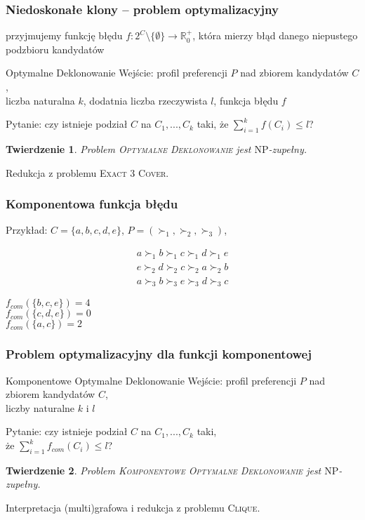 \documentclass{beamer}
\newtheorem{tw}{Twierdzenie}
\begin{document}
\begin{frame} \frametitle{Niedoskonałe klony -- problem optymalizacyjny}
  przyjmujemy funkcję błędu $f: 2^C \setminus \{\emptyset\} \rightarrow \mathbb{R}_0^+$,
  która mierzy błąd danego niepustego podzbioru kandydatów 
  
  
	\begin{aproblem}{Optymalne Deklonowanie}
		Wejście: profil preferencji $P$ nad zbiorem kandydatów $C$,\\
			liczba naturalna $k$, dodatnia liczba rzeczywista $l$, funkcja błędu $f$

		Pytanie: czy istnieje podział $C$ na $C_1, ..., C_k$ taki, że $\sum_{i=1}^k f(C_i) \leq l$?
	\end{aproblem}

	\vfill
	
	\begin{tw}
		Problem \textsc{Optymalne Deklonowanie} jest $\text{NP}$-zupełny.
	\end{tw}
	
	Redukcja z problemu \textsc{Exact 3 Cover}.
\end{frame}

\begin{frame} \frametitle{Komponentowa funkcja błędu}
	Przykład: $C = \{a, b, c, d, e\}$, $P = (\succ_1, \succ_2, \succ_3)$,
	
	\begin{align*}
		a \succ_1 b \succ_1 c \succ_1 d \succ_1 e\\
		e \succ_2 d \succ_2 c \succ_2 a \succ_2 b\\
		a \succ_3 b \succ_3 e \succ_3 d \succ_3 c
	\end{align*}
	\vfill
	
	$f_{com}(\{b,c,e\}) = 4$ \\
	$f_{com}(\{c,d,e\}) = 0$ \\
	$f_{com}(\{a,c\}) = 2$
\end{frame}

\begin{frame} \frametitle{Problem optymalizacyjny dla funkcji komponentowej}
	\begin{aproblem}{Komponentowe Optymalne Deklonowanie}
		Wejście: profil preferencji $P$ nad zbiorem kandydatów $C$,\\
			liczby naturalne $k$ i $l$

		Pytanie: czy istnieje podział $C$ na $C_1, ..., C_k$ taki, \\
			że $\sum_{i=1}^k f_{com}(C_i) \leq l$?
	\end{aproblem}

	\vfill	
	
	\begin{tw}
		Problem \textsc{Komponentowe Optymalne Deklonowanie} jest $\text{NP}$-zupełny.
	\end{tw}
	
	Interpretacja (multi)grafowa i redukcja z problemu \textsc{Clique}.
\end{frame}
\end{document}
